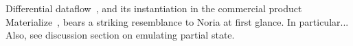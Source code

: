 \begin{comment}
http://www.vldb.org/pvldb/vol13/p1793-mcsherry.pdf
https://www.inf.ufrgs.br/prosoft/publications/2016/mertz-tse-2016-pre-print.pdf
https://people.csail.mit.edu/nickolai/papers/gupta-cachegenie.pdf
https://arxiv.org/abs/2004.14471
https://arxiv.org/abs/2001.00888
\end{comment}

Differential dataflow~\cite{naiad,differential-dataflow}, and its instantiation
in the commercial product Materialize~\cite{materialize}, bears a striking
resemblance to Noria at first glance. In particular... Also, see discussion
section on emulating partial state.
